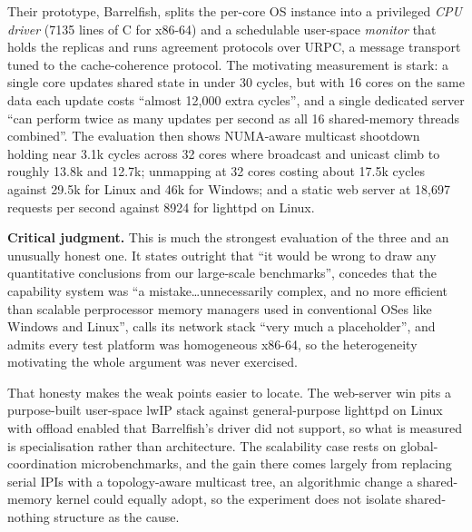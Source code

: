 Their prototype, Barrelfish, splits the per-core OS instance into a privileged
\emph{CPU driver} (7135 lines of C for x86-64) and a schedulable user-space \emph{monitor}
that holds the replicas and runs agreement protocols over URPC, a message transport tuned
to the cache-coherence protocol. The motivating measurement is stark: a single core updates
shared state in under 30 cycles, but with 16 cores on the same data each update costs
``almost 12{,}000 extra cycles'', and a single dedicated server ``can perform twice as many
updates per second as all 16 shared-memory threads combined''. The evaluation then shows
NUMA-aware multicast shootdown holding near 3.1k cycles across 32 cores where broadcast and
unicast climb to roughly 13.8k and 12.7k; unmapping at 32 cores costing about 17.5k cycles
against 29.5k for Linux and 46k for Windows; and a static web server at 18{,}697 requests
per second against 8924 for lighttpd on Linux.

\textbf{Critical judgment.} This is much the strongest evaluation of the three and an
unusually honest one. It states outright that ``it would be wrong to draw any quantitative
conclusions from our large-scale benchmarks'', concedes that the capability system was ``a
mistake\ldots unnecessarily complex, and no more efficient than scalable perprocessor
memory managers used in conventional OSes like Windows and Linux'', calls its network stack
``very much a placeholder'', and admits every test platform was homogeneous x86-64, so the
heterogeneity motivating the whole argument was never exercised.

That honesty makes the weak points easier to locate. The web-server win pits a
purpose-built user-space lwIP stack against general-purpose lighttpd on Linux with offload
enabled that Barrelfish's driver did not support, so what is measured is specialisation
rather than architecture. The scalability case rests on global-coordination
microbenchmarks, and the gain there comes largely from replacing serial IPIs with a
topology-aware multicast tree, an algorithmic change a shared-memory kernel could equally
adopt, so the experiment does not isolate shared-nothing structure as the cause.

